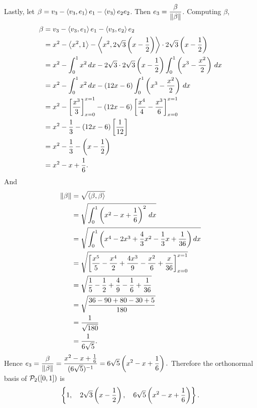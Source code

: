     \nl Lastly, let $\beta = v_3 - \left\langle{v_3,e_1}\right\rangle e_1 - \left\langle{v_3}\right\rangle{e_2}e_2$. Then $e_3 = \dfrac{\beta}{\left\| {\beta} \right\|}$. Computing $\beta$,
    \begin{align*}
        \beta &= v_3 - \left\langle{v_3,e_1}\right\rangle e_1 - \left\langle{v_3,e_2}\right\rangle e_2\\
        &= x^2 - \left\langle{x^2, 1}\right\rangle - \left\langle{x^2, 2\sqrt{3}\left( {x - \frac{1}{{2}}} \right) }\right\rangle\cdot 2\sqrt{3}\left( {x - \frac{1}{{2}}} \right)\\
        &= x^2 - \int_0^1 x^2 \, dx - 2\sqrt{3} \cdot 2\sqrt{3}\left( {x - \frac{1}{{2}}} \right) \int_0^1 \left( {x^3 - \frac{x^2}{2}} \right) \,dx\\
        &= x^2 - \int_0^1 x^2 \, dx - \left( { 12x-6 } \right) \int_0^1 \left( {x^3 - \frac{x^2}{2}} \right) \,dx\\
        &= x^2 - \left[ {\frac{x^3}{3}} \right]_{x=0}^{x=1} - \left( { 12x-6 } \right) \left[ {\frac{x^4}{4} - \frac{x^3}{6}} \right]_{x=0}^{x=1}\\
        &= x^2 - \frac{1}{{3}} - \left( { 12x-6 } \right) \left[ {\frac{1}{{12}}} \right]\\
        &= x^2 - \frac{1}{{3}} - \left( { x-\frac{1}{{2}} } \right)\\
        &= x^2 - x + \frac{1}{{6}}.
    \end{align*}
    And
    \begin{align*}
        \left\| {\beta} \right\| &= \sqrt{\left\langle{\beta, \beta}\right\rangle}\\
        &= \sqrt{\int_0^1 \left( {x^2 - x + \frac{1}{{6}}} \right)^2\,dx}\\
        &= \sqrt{\int_0^1 \left( {x^4 - 2x^3 + \frac 43x^2 -\frac 13x + \frac{1}{{36}}} \right)dx}\\
        &= \sqrt{\left[ {\frac{x^5}{5} - \frac{x^4}{2} + \frac{4x^3}{9} - \frac{x^2}{6} + \frac{x}{36} } \right]_{x=0}^{x=1}}\\
        &= \sqrt{\frac{1}{{5}} - \frac{1}{{2}} + \frac{4}{9} - \frac{1}{{6}} + \frac{1}{{36}}}\\
        &= \sqrt{\frac{36-90+80-30+5}{180}}\\
        &= \frac{1}{{\sqrt{180}}}\\
        &= \frac{1}{{6\sqrt{5}}}.
    \end{align*}
    Hence $\displaystyle
        e_3 = \frac{\beta}{\left\| {\beta} \right\|} = \frac{x^2 - x + \frac{1}{{6}}}{(6\sqrt{5})^{-1}}
        = 6\sqrt{5}\left( {x^2 - x + \frac{1}{{6}}} \right).$
    Therefore the orthonormal basis of $\mathcal{P}_{2}({[0,1]})$ is
    $$\left\{{1,\quad 2\sqrt3 \left( {x-\frac{1}{{2}}} \right), \quad 6\sqrt{5}\left( {x^2 - x + \frac{1}{{6}}} \right) }\right\}.$$
